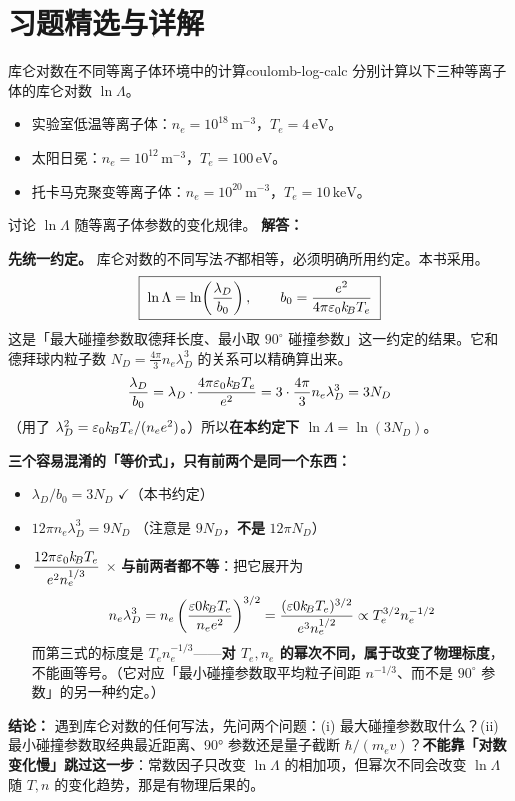 
\section*{习题精选与详解}
{}

\begin{example}{库仑对数在不同等离子体环境中的计算}{coulomb-log-calc}
分别计算以下三种等离子体的库仑对数 $\ln\Lambda$。
\begin{itemize}[leftmargin=*,itemsep=0pt]
\item 实验室低温等离子体：$n_e = 10^{18}\,\mathrm{m}^{-3}$，$T_e = 4\,\mathrm{eV}$。
\item 太阳日冕：$n_e = 10^{12}\,\mathrm{m}^{-3}$，$T_e = 100\,\mathrm{eV}$。
\item 托卡马克聚变等离子体：$n_e = 10^{20}\,\mathrm{m}^{-3}$，$T_e = 10\,\mathrm{keV}$。
\end{itemize}
讨论 $\ln\Lambda$ 随等离子体参数的变化规律。
\tcblower
\textbf{解答：}

\textbf{先统一约定。} 库仑对数的不同写法\emph{不}都相等，必须明确所用约定。本书采用。
\[
\boxed{\;\ln\Lambda = \ln\!\left(\frac{\lambda_D}{b_0}\right),\qquad b_0 = \frac{e^2}{4\pi\varepsilon_0 k_{\!B}T_e}\;}
\]
这是「最大碰撞参数取德拜长度、最小取 $90^\circ$ 碰撞参数」这一约定的结果。它和德拜球内粒子数 $N_D=\frac{4\pi}{3}n_e\lambda_D^3$ 的关系可以精确算出来。
\[
\frac{\lambda_D}{b_0} = \lambda_D\cdot\frac{4\pi\varepsilon_0 k_{\!B}T_e}{e^2} = 3\cdot\frac{4\pi}{3}n_e\lambda_D^3 = 3N_D
\]
（用了 $\lambda_D^2=\varepsilon_0k_{\!B}T_e/(n_ee^2)$。）所以\textbf{在本约定下 $\ln\Lambda=\ln(3N_D)$}。

\textbf{三个容易混淆的「等价式」，只有前两个是同一个东西：}
\begin{itemize}
\item $\lambda_D/b_0 = 3N_D$ \quad$\checkmark$（本书约定）
\item $12\pi n_e\lambda_D^3 = 9N_D$ \quad（注意是 $9N_D$，\textbf{不是} $12\pi N_D$）
\item $\dfrac{12\pi\varepsilon_0k_{\!B}T_e}{e^2n_e^{1/3}}$ \quad$\times$ \textbf{与前两者都不等}：把它展开为
\[
n_e\lambda_D^3 = n_e\left(\frac{\varepsilon0 k_{\!B}T_e}{n_ee^2}\right)^{3/2} = \frac{(\varepsilon0k_{\!B}T_e)^{3/2}}{e^3n_e^{1/2}}
\propto T_e^{3/2}n_e^{-1/2}
\]
而第三式的标度是 $T_en_e^{-1/3}$——\textbf{对 $T_e,n_e$ 的幂次不同，属于改变了物理标度}，不能画等号。（它对应「最小碰撞参数取平均粒子间距 $n^{-1/3}$、而不是 $90^\circ$ 参数」的另一种约定。）
\end{itemize}
\textbf{结论：} 遇到库仑对数的任何写法，先问两个问题：(i) 最大碰撞参数取什么？(ii) 最小碰撞参数取经典最近距离、90° 参数还是量子截断 $\hbar/(m_ev)$？\textbf{不能靠「对数变化慢」跳过这一步}：常数因子只改变 $\ln\Lambda$ 的相加项，但幂次不同会改变 $\ln\Lambda$ 随 $T,n$ 的变化趋势，那是有物理后果的。


\end{example}
